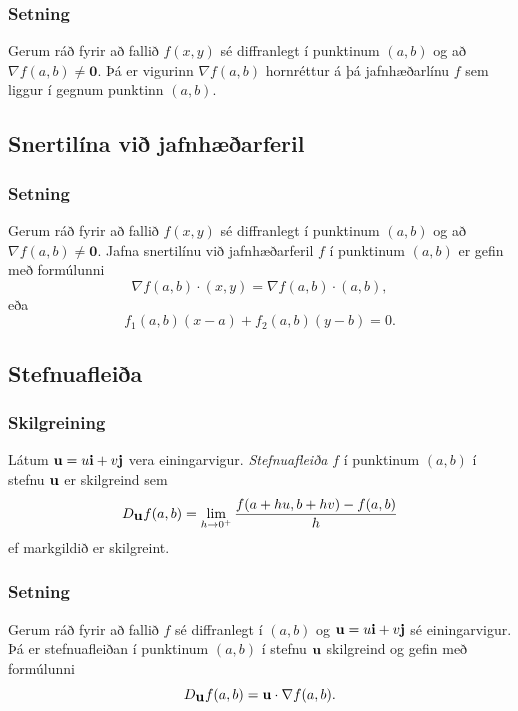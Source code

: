 \subsubsection{Setning }
  Gerum ráð fyrir að fallið $f(x,y)$ sé
diffranlegt í punktinum $(a,b)$ og að $\nabla f(a,b) \neq \mathbf{0}$.  Þá er vigurinn $\nabla f(a,b)$ 
hornréttur á þá jafnhæðarlínu $f$ sem liggur í gegnum punktinn $(a,b)$.








\subsection{Snertilína við jafnhæðarferil} 

\subsubsection{Setning }
  Gerum ráð fyrir að fallið $f(x,y)$ sé
diffranlegt í punktinum $(a,b)$ og að $\nabla f(a,b) \neq \mathbf{0}$.  Jafna snertilínu við jafnhæðarferil $f$ í punktinum $(a,b)$ er gefin
með formúlunni 
$$\nabla f(a,b)\cdot (x,y)=\nabla f(a,b)\cdot (a,b),$$
eða 
$$f_1(a,b)(x-a)+f_2(a,b)(y-b)=0.$$




\subsection{Stefnuafleiða} 

\subsubsection{Skilgreining }
 Látum $\mbox{${\bf u}$}=u\mbox{${\bf i}$}+v\mbox{${\bf j}$}$ vera einingarvigur.  {\em Stefnuafleiða} $f$ í punktinum $(a,b)$ í stefnu $\mbox{${\bf u}$}$ er skilgreind
  sem 
$$D_{\mbox{${\bf u}$}}f(a,b)=\lim_{h\rightarrow 0^+}\frac{f(a+hu, b+hv)-f(a,b)}{h}$$
ef markgildið er skilgreint.  




\subsubsection{Setning }
Gerum ráð fyrir að fallið $f$ sé diffranlegt í
$(a,b)$ og $\mbox{${\bf u}$}=u\mbox{${\bf i}$}+v\mbox{${\bf j}$}$ sé einingarvigur.  Þá er stefnuafleiðan í
punktinum $(a,b)$ í stefnu $\mbox{${\bf u}$}$ skilgreind og gefin með formúlunni
$$D_{\mbox{${\bf u}$}}f(a,b)=\mbox{${\bf u}$}\cdot \nabla f(a,b).$$





